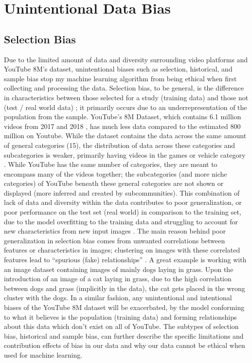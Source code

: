 \documentclass[10pt,twocolumn]{article}
\begin{document}
\section {Unintentional Data Bias}

\subsection {Selection Bias}

Due to the limited amount of data and diversity surrounding video platforms and YouTube 8M’s dataset, unintentional biases such as selection, historical, and sample bias stop my machine learning algorithm from being ethical when first collecting and processing the data.
Selection bias, to be general, is the difference in characteristics between those selected for a study (training data) and those not (test / real world data) \cite{Yu2020}; it primarily occurs due to an underrepresentation of the population from the sample. YouTube’s 8M Dataset, which contains 6.1 million videos from 2017 and 2018 \cite{googleYT8M}, has much less data compared to the estimated 800 million on Youtube. While the dataset contains the data across the same amount of general categories (15), the distribution of data across these categories and subcategories is weaker, primarily having videos in the games or vehicle category \cite{googleYT8M}. While YouTube has the same number of categories, they are meant to encompass many of the videos together; the subcategories (and more niche categories) of YouTube beneath these general categories are not shown or displayed (more inferred and created by subcommunities). This combination of lack of data and diversity within the data contributes to poor generalization, or poor performance on the test set (real world) in comparison to the training set, due to the model overfitting to the training data and struggling to account for new characteristics from new input images \cite{Yu2020}. The main reason behind poor generalization in selection bias comes from unwanted correlations between features or characteristics in images; clustering on images with these correlated features lead to “spurious (fake) relationships” \cite{Yu2020}. A great example is working with an image dataset containing images of mainly dogs laying in grass. Upon the introduction of an image of a cat laying in grass, due to the high correlation between dogs and grass (implicitly in the data), the cat gets placed in the wrong cluster with the dogs. In a similar fashion, any unintentional and intentional biases of the YouTube 8M dataset will be exacerbated, by the model conforming to what it believes is the population (training data) and forming relationships about this data which don’t exist on all of YouTube. The subtypes of selection bias, historical and sample bias, can further describe the specific limitations and contribution effects of bias in our data and why our data cannot be ethical when used for machine learning.
\end{document}
